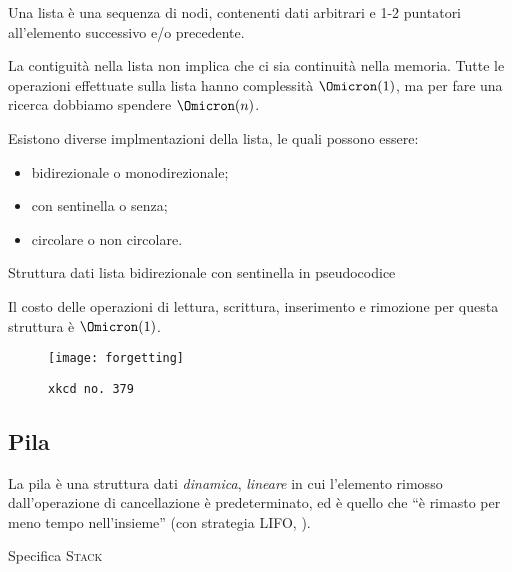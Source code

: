 Una lista è una sequenza di nodi, contenenti dati arbitrari e 1-2 puntatori all'elemento successivo e/o precedente.

La contiguità nella lista non implica che ci sia continuità nella memoria.
Tutte le operazioni effettuate sulla lista hanno complessità \(\Omicron(1)\), ma per fare una ricerca dobbiamo spendere \(\Omicron(n)\).

Esistono diverse implmentazioni della lista, le quali possono essere:
\begin{itemize}
	\item bidirezionale o monodirezionale;
	\item con sentinella o senza;
	\item circolare o non circolare.
\end{itemize}


\begin{algorithm}[H]
	\caption{Struttura dati lista bidirezionale con sentinella in pseudocodice}
	
\end{algorithm}

Il costo delle operazioni di lettura, scrittura, inserimento e rimozione per questa struttura è \(\Omicron(1)\).

\begin{code}
	\label{code:java-lista-bidirezionale-sentinella}
\end{code}

\begin{figure}[H]
	\centering
	\texttt{[image: forgetting]}
	\caption[]{\texttt{xkcd no.\ 379}}
	\label{fig:forgetting}
\end{figure}

\subsection{Pila}

La pila è una struttura dati \emph{dinamica}, \emph{lineare} in cui l'elemento rimosso dall'operazione di cancellazione è predeterminato, ed è quello che \enquote{è rimasto per meno tempo nell'insieme} (con strategia \textsc{LIFO}, ).

\begin{algorithm}[H]
	\caption[Specifica pila]{Specifica \textsc{Stack}}
	
\end{algorithm}

